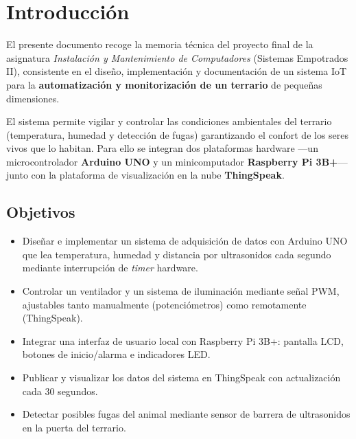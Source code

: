 \documentclass[12pt, a4paper]{article}
\begin{document}
\section{Introducción}

El presente documento recoge la memoria técnica del proyecto final de la asignatura
\textit{Instalación y Mantenimiento de Computadores} (Sistemas Empotrados II), consistente
en el diseño, implementación y documentación de un sistema IoT para la \textbf{automatización
y monitorización de un terrario} de pequeñas dimensiones.

El sistema permite vigilar y controlar las condiciones ambientales del terrario
(temperatura, humedad y detección de fugas) garantizando el confort de los seres
vivos que lo habitan. Para ello se integran dos plataformas hardware ---un
microcontrolador \textbf{Arduino UNO} y un minicomputador \textbf{Raspberry Pi 3B+}---
junto con la plataforma de visualización en la nube \textbf{ThingSpeak}.

\subsection{Objetivos}

\begin{itemize}[noitemsep]
    \item Diseñar e implementar un sistema de adquisición de datos con Arduino UNO
          que lea temperatura, humedad y distancia por ultrasonidos cada segundo
          mediante interrupción de \textit{timer} hardware.
    \item Controlar un ventilador y un sistema de iluminación mediante señal PWM,
          ajustables tanto manualmente (potenciómetros) como remotamente (ThingSpeak).
    \item Integrar una interfaz de usuario local con Raspberry Pi 3B+: pantalla LCD,
          botones de inicio/alarma e indicadores LED.
    \item Publicar y visualizar los datos del sistema en ThingSpeak con actualización
          cada 30 segundos.
    \item Detectar posibles fugas del animal mediante sensor de barrera de ultrasonidos
          en la puerta del terrario.
\end{itemize}

\newpage

\end{document}

